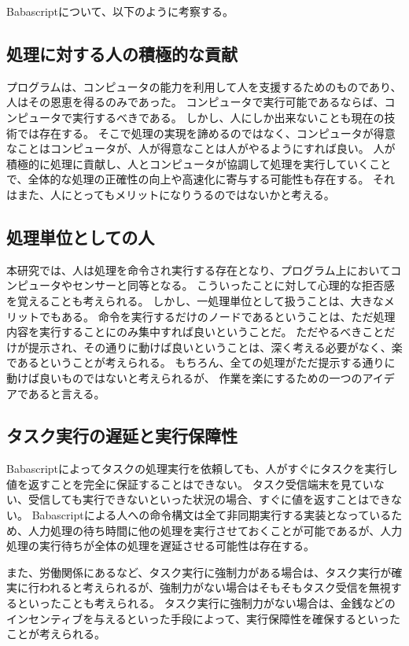\documentclass[twoside]{wiss}
\begin{document}
Babascriptについて、以下のように考察する。

\subsection{処理に対する人の積極的な貢献}

プログラムは、コンピュータの能力を利用して人を支援するためのものであり、人はその恩恵を得るのみであった。
コンピュータで実行可能であるならば、コンピュータで実行するべきである。
しかし、人にしか出来ないことも現在の技術では存在する。
そこで処理の実現を諦めるのではなく、コンピュータが得意なことはコンピュータが、人が得意なことは人がやるようにすれば良い。
人が積極的に処理に貢献し、人とコンピュータが協調して処理を実行していくことで、全体的な処理の正確性の向上や高速化に寄与する可能性も存在する。
それはまた、人にとってもメリットになりうるのではないかと考える。

\subsection{処理単位としての人}

本研究では、人は処理を命令され実行する存在となり、プログラム上においてコンピュータやセンサーと同等となる。
こういったことに対して心理的な拒否感を覚えることも考えられる。
しかし、一処理単位として扱うことは、大きなメリットでもある。
命令を実行するだけのノードであるということは、ただ処理内容を実行することにのみ集中すれば良いということだ。
ただやるべきことだけが提示され、その通りに動けば良いということは、深く考える必要がなく、楽であるということが考えられる。
もちろん、全ての処理がただ提示する通りに動けば良いものではないと考えられるが、
作業を楽にするための一つのアイデアであると言える。

\subsection{タスク実行の遅延と実行保障性}

Babascriptによってタスクの処理実行を依頼しても、人がすぐにタスクを実行し値を返すことを完全に保証することはできない。
タスク受信端末を見ていない、受信しても実行できないといった状況の場合、すぐに値を返すことはできない。
Babascriptによる人への命令構文は全て非同期実行する実装となっているため、人力処理の待ち時間に他の処理を実行させておくことが可能であるが、人力処理の実行待ちが全体の処理を遅延させる可能性は存在する。

また、労働関係にあるなど、タスク実行に強制力がある場合は、タスク実行が確実に行われると考えられるが、強制力がない場合はそもそもタスク受信を無視するといったことも考えられる。
タスク実行に強制力がない場合は、金銭などのインセンティブを与えるといった手段によって、実行保障性を確保するといったことが考えられる。
\end{document}
